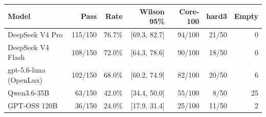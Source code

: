 \begin{tabular}{lrrrrrr}
\toprule
\textbf{Model} & \textbf{Pass} & \textbf{Rate} & \textbf{Wilson 95\%}
  & \textbf{Core-100} & \textbf{hard3} & \textbf{Empty} \\
\midrule
DeepSeek V4 Pro
  & 115/150 & 76.7\% & [69.3, 82.7]
  & 94/100 & 21/50 & 0 \\
DeepSeek V4 Flash
  & 108/150 & 72.0\% & [64.3, 78.6]
  & 90/100 & 18/50 & 0 \\
gpt-5.6-luna (OpenLux)
  & 102/150 & 68.0\% & [60.2, 74.9]
  & 82/100 & 20/50 & 6 \\
Qwen3.6-35B
  & 63/150 & 42.0\% & [34.4, 50.0]
  & 55/100 & 8/50 & 25 \\
GPT-OSS 120B
  & 36/150 & 24.0\% & [17.9, 31.4]
  & 25/100 & 11/50 & 2 \\
\bottomrule
\end{tabular}
